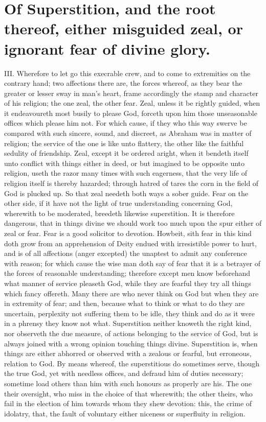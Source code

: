 \section*{Of Superstition, and the root thereof, either misguided zeal, or ignorant fear of divine glory.}

III. Wherefore to let go this execrable crew, and to come to extremities on the contrary hand; two affections there are, the forces whereof, as they bear the greater or lesser sway in man’s heart, frame accordingly the stamp and character of his religion; the one zeal, the other fear.
Zeal, unless it be rightly guided, when it endeavoureth most busily to please God, forceth upon him those unseasonable offices which please him not. For which cause, if they who this way swerve be compared with such sincere, sound,  and discreet, as Abraham was in matter of religion; the service of the one is like unto flattery, the other like the faithful sedulity of friendship. Zeal, except it be ordered aright, when it bendeth itself unto conflict with things either in deed, or but imagined to be opposite unto religion, useth the razor many times with such eagerness, that the very life of religion itself is thereby hazarded; through hatred of tares the corn in the field of God is plucked up. So that zeal needeth both ways a sober guide.
Fear on the other side, if it have not the light of true understanding concerning God, wherewith to be moderated, breedeth likewise superstition. It is therefore dangerous, that in things divine we should work too much upon the spur either of zeal or fear. Fear is a good solicitor to devotion. Howbeit, sith fear in this kind doth grow from an apprehension of Deity endued with irresistible power to hurt, and is of all affections (anger excepted) the unaptest to admit any conference with reason; for which cause the wise man doth say of fear that it is a betrayer of the forces of reasonable understanding; therefore except men know beforehand what manner of service pleaseth God, while they are fearful they try all things which fancy offereth. Many there are who never think on God but when they are in extremity of fear; and then, because what to think or what to do they are uncertain, perplexity not suffering them to be idle, they think and do as it were in a phrensy they know not what.
Superstition neither knoweth the right kind, nor observeth the due measure, of actions belonging to the service of God, but is always joined with a wrong opinion touching things divine. Superstition is, when things are either abhorred or observed with a zealous or fearful, but erroneous, relation to God. By means whereof, the superstitious do sometimes serve, though the true God, yet with needless offices, and defraud him of duties necessary; sometime load others than him with such honours as properly are his. The one their oversight, who miss in the choice of that wherewith; the other theirs, who fail in the election of him towards whom they shew devotion: this, the crime of idolatry, that, the fault of voluntary either niceness or superfluity in religion.

